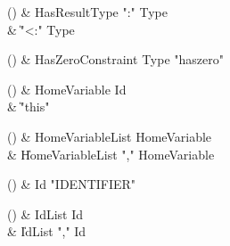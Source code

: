\begin{bbgrammarappendix}

() & HasResultType \label{prod:HasResultType}  \: \xcd":" Type  \\

 &    \| \xcd"<:" Type \\

\end{bbgrammarappendix}

\begin{bbgrammarappendix}

() & HasZeroConstraint \label{prod:HasZeroConstraint}  \: Type  \xcd"haszero"  \\


\end{bbgrammarappendix}

\begin{bbgrammarappendix}

() & HomeVariable \label{prod:HomeVariable}  \: Id  \\

 &    \| \xcd"this" \\

\end{bbgrammarappendix}

\begin{bbgrammarappendix}

() & HomeVariableList \label{prod:HomeVariableList}  \: HomeVariable  \\

 &    \| HomeVariableList \xcd"," HomeVariable \\

\end{bbgrammarappendix}

\begin{bbgrammarappendix}

() & Id \label{prod:Id}  \: \xcd"IDENTIFIER"   \\


\end{bbgrammarappendix}

\begin{bbgrammarappendix}

() & IdList \label{prod:IdList}  \: Id  \\

 &    \| IdList \xcd"," Id \\

\end{bbgrammarappendix}

